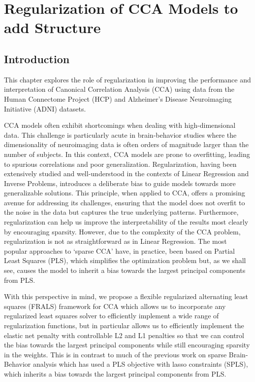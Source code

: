 \graphicspath{{chapters/regularization}}
\chapter{Regularization of CCA Models to add Structure}\label{chap:als}
\minitoc
\section{Introduction}\label{sec:introduction}

This chapter explores the role of regularization in improving the performance and interpretation of Canonical
Correlation Analysis (CCA) using data from the Human Connectome Project (HCP) and Alzheimer's Disease Neuroimaging Initiative (ADNI) datasets.

CCA models often exhibit shortcomings when dealing with high-dimensional data.
This challenge is particularly acute in brain-behavior studies where the dimensionality of neuroimaging data is often orders of magnitude larger than the number of subjects.
In this context, CCA models are prone to overfitting, leading to spurious correlations and poor generalization.
Regularization, having been extensively studied and well-understood in the contexts of Linear Regression and Inverse Problems, introduces a deliberate bias to guide models towards more generalizable solutions.
This principle, when applied to CCA, offers a promising avenue for addressing its challenges, ensuring that the model does not overfit to the noise in the data but captures the true underlying patterns.
Furthermore, regularization can help us improve the interpretability of the results most clearly by encouraging sparsity.
However, due to the complexity of the CCA problem, regularization is not as straightforward as in Linear Regression.
The most popular approaches to `sparse CCA' have, in practice, been based on Partial Least Squares (PLS), which simplifies the optimization problem but, as we shall see, causes the model to inherit a bias towards the largest principal components from PLS.

With this perspective in mind, we propose a flexible regularized alternating least squares (FRALS) framework for CCA which allows us to incorporate any regularized least squares solver to efficiently implement a wide range of regularization functions, but in particular allows us to efficiently implement the elastic net penalty with controllable L2 and L1 penalties so that we can control the bias towards the largest principal components while still encouraging sparsity in the weights.
This is in contrast to much of the previous work on sparse Brain-Behavior analysis which has used a PLS objective with lasso constraints (SPLS), which inherits a bias towards the largest principal components from PLS.


